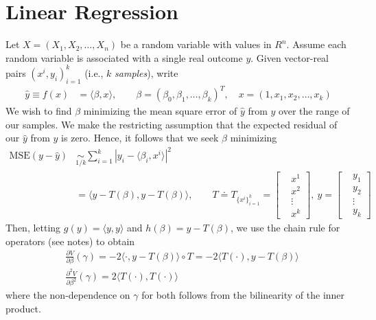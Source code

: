 \chapter{Linear Regression}
Let $X = (X_{1}, X_{2}, \dots, X_{n})$ be a random variable with values in 
$R^{n}$. Assume each random variable is associated with a single real
outcome $y$. Given vector-real pairs $\left( x^{i}, y_{i} \right)_{i=1}^{k}$
(i.e., $k$  
\textit{samples}), write
\begin{equation*}
	\begin{split}
		\hat{y} \equiv f(x) & = \langle \beta, x \rangle, \qquad \beta =
		(\beta_{0}, \beta_{1}, \dots, \beta_{k})^{T}, \quad x = (1, x_{1}, x_{2},
		\dots, x_{k})  
	\end{split}
\end{equation*}
We wish to find $\beta$ minimizing the mean square error of $\hat{y}$ from $y$ over the range of our samples. We make the restricting assumption that the expected
residual of our $\hat{y}$ from $y$ is zero. Hence, it follows that we seek 
$\beta$ minimizing
\begin{equation*}
	\begin{split}
		\mathrm{MSE}(y - \hat{y}) & \underset{1/k}{\sim} \sum_{i=1}^{k} | y_{i} - \langle \beta_{i}, x^{i} \rangle 
		|^{2}
		\\
		& = \langle y - T(\beta), y - T(\beta) \rangle , \qquad T \doteq
		T_{\{x^{i}\}_{i=1}^{k}} = \begin{bmatrix}
			& x^{1} \\
			& x^{2} \\
			& \vdots \\
			& x^{k}
		\end{bmatrix}, \
		y = \begin{bmatrix}
			& y_{1} 
			\\
			& y_{2}
			\\
			& \vdots
			\\
			& y_{k}
		\end{bmatrix}
	\end{split}
\end{equation*}
Then, letting $g(y) = \langle y,y \rangle $ and $h(\beta) = y - T(\beta)$, we
use the chain rule for operators (see notes) to obtain
\begin{equation*}
	\begin{split}
		& \frac{\partial V}{\partial \beta}(\gamma)  = -2 \langle \cdot, y - T(\beta)
		\rangle \circ T
		= -2 \langle T(\cdot), y - T(\beta) \rangle 
		\\
		& \frac{\partial^{2} V}{\partial \beta^{2}} (\gamma) = 2 \langle T(\cdot), T(\cdot) \rangle 
	\end{split}
\end{equation*}
where the non-dependence on $\gamma$ for both follows from the bilinearity of the inner product. 

